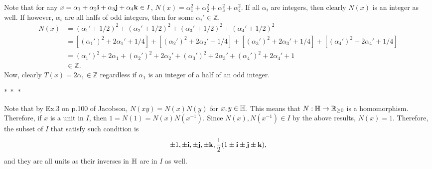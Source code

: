 \documentclass[12pt]{article}
\begin{document}
\begin{fproof}[Jacobson 2.4.5]
    Note that for any \(x = \alpha_1 + \alpha_2\mathbf{i} + \alpha_3 \mathbf{j} + \alpha_4\mathbf{k} \in I\),
    \(N(x) = \alpha_1^2 + \alpha_2^2 + \alpha_3^2 + \alpha_4^2\).
    If all \(\alpha_i\) are integers, then clearly \(N(x)\) is an integer as well.
    If however, \(\alpha_i\) are all halfs of odd integers, then for some \(\alpha_i' \in \mathbb{Z}\),
    \begin{align*}
        N(x) &= (\alpha_1' + 1/2)^2 + (\alpha_2' + 1/2)^2 + (\alpha_3' + 1/2)^2 + (\alpha_4' + 1/2)^2\\
        &= [(\alpha_1')^2 + 2 \alpha_1' + 1/4] + [(\alpha_2')^2 + 2 \alpha_2' + 1/4] + [(\alpha_3')^2 + 2 \alpha_3' + 1/4] + [(\alpha_4')^2 + 2 \alpha_4' + 1/4]\\
        &= (\alpha_1')^2 + 2 \alpha_1 + (\alpha_2')^2 + 2 \alpha_2' + (\alpha_3')^2 + 2 \alpha_3' + (\alpha_4')^2 + 2 \alpha_4' + 1\\
        & \in \mathbb{Z}.
    \end{align*}
    Now, clearly \(T(x) = 2 \alpha_1 \in \mathbb{Z}\) regardless if \(\alpha_1\) is an integer of a half of an odd integer.

    \begin{center}
        \(\ast~\ast~\ast\)
    \end{center}

    Note that by Ex.3 on p.100 of Jacobson, \(N(xy) = N(x)N(y)\) for \(x,y \in \mathbb {H}\).
    This means that \(N: \mathbb {H} \to \mathbb {R}_{\geq 0}\) is a homomorphism.
    Therefore, if \(x\) is a unit in \(I\), then \(1 = N(1) = N(x)N(x^{-1})\).
    Since \(N(x), N(x^{-1}) \in I\) by the above results, \(N(x) = 1\).
    Therefore, the subset of \(I\) that satisfy such condition is
    \begin{align*}
        \pm 1, \pm \mathbf{i}, \pm \mathbf{j}, \pm \mathbf{k}, \frac{1}{2}(1 \pm \mathbf{i} \pm \mathbf{j} \pm \mathbf{k}),
    \end{align*}
    and they are all units as their inverses in \(\mathbb {H}\) are in \(I\) as well.


\end{fproof}
\newpage
\end{document}
